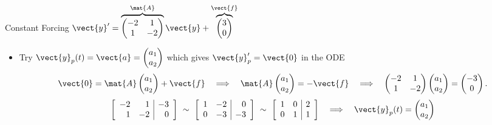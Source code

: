 \begin{frame}{Constant Forcing \qquad $\vect{y}'=\overbrace{\begin{pmatrix}-2&1\\1&-2\end{pmatrix}}^{\mat{A}}\vect{y}+\overbrace{\begin{pmatrix}3\\0\end{pmatrix}}^{\vect{f}}$}
\small
\setlength{\abovedisplayskip}{3pt}
\setlength{\belowdisplayskip}{3pt}
\begin{itemize}
\setlength{\itemsep}{3pt}
  \item Try 
  $\vect{y}_p(t)=\vect{a} =
  \begin{pmatrix}a_1\\a_2\end{pmatrix}$ which gives 
  $\vect{y}_p'=\vect{0}$ in the ODE
  \[
    \vect{0}=\mat{A}\begin{pmatrix}a_1\\a_2\end{pmatrix}+\vect{f}
    \quad\Longrightarrow\quad
    \mat{A}\begin{pmatrix}a_1\\a_2\end{pmatrix}=-\vect{f}
    \quad\Longrightarrow\quad
    \begin{pmatrix}-2&1\\1&-2\end{pmatrix}
    \begin{pmatrix}a_1\\a_2\end{pmatrix}
    =\begin{pmatrix}-3\\0\end{pmatrix}.
  \]
  \[
    \left[\begin{array}{rr|r}-2&1&-3\\1&-2&0\end{array}\right]
    \ \sim\ 
    \left[\begin{array}{rr|r}1&-2&0\\0&-3&-3\end{array}\right]
    \ \sim\ 
    \left[\begin{array}{rr|r}1&0&2\\0&1&1\end{array}\right]
    \quad\Longrightarrow\quad
    \vect{y}_p(t)=\begin{pmatrix}a_1\\a_2\end{pmatrix}
\]
\end{itemize}
\end{frame}
